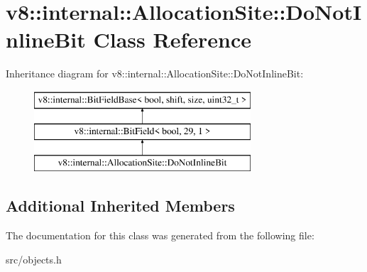 \hypertarget{classv8_1_1internal_1_1_allocation_site_1_1_do_not_inline_bit}{}\section{v8\+:\+:internal\+:\+:Allocation\+Site\+:\+:Do\+Not\+Inline\+Bit Class Reference}
\label{classv8_1_1internal_1_1_allocation_site_1_1_do_not_inline_bit}
Inheritance diagram for v8\+:\+:internal\+:\+:Allocation\+Site\+:\+:Do\+Not\+Inline\+Bit\+:\begin{figure}[H]
\begin{center}
\leavevmode
\includegraphics[height=3.000000cm]{classv8_1_1internal_1_1_allocation_site_1_1_do_not_inline_bit}
\end{center}
\end{figure}
\subsection*{Additional Inherited Members}


The documentation for this class was generated from the following file\+:\begin{DoxyCompactItemize}
\item 
src/objects.\+h\end{DoxyCompactItemize}
